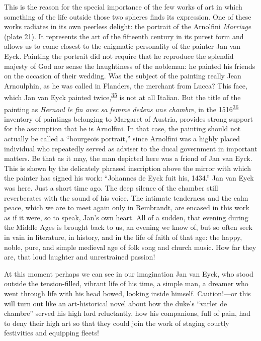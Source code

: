 This is the reason for the special importance of the few works of art in
which something of the life outside those two spheres finds its
expression. One of these works radiates in its own peerless delight: the
portrait of the Arnolfini \emph{Marriage}
(\protect\hyperlink{20_ILLUSTRATIONS_FOLLOW_PAGE.xhtmlux5cux23id_20}{plate
21}). It represents the art of the fifteenth century in its purest form
and allows us to come closest to the enigmatic personality of the
painter Jan van Eyck. Painting the portrait did not require that he
reproduce the splendid majesty of God nor sense the haughtiness of the
nobleman: he painted his friends on the occasion of their wedding. Was
the subject of the painting really Jean Arnoulphin, as he was called in
Flanders, the merchant from Lucca? This face, which Jan van Eyck painted
twice,\textsuperscript{\protect\hypertarget{20_ILLUSTRATIONS_FOLLOW_PAGE.xhtmlux5cux23id_403}{\protect\hyperlink{23_NOTES.xhtmlux5cux23id_404}{35}}}
is not at all Italian. But the title of the painting as \emph{Hernoul le
fin avec sa femme dedens une chambre}, in the
1516\textsuperscript{\protect\hypertarget{20_ILLUSTRATIONS_FOLLOW_PAGE.xhtmlux5cux23id_401}{\protect\hyperlink{23_NOTES.xhtmlux5cux23id_402}{36}}}
inventory of paintings belonging to Margaret of Austria, provides strong
support for the assumption that he is Arnolfini. In that case, the
painting should not actually be called a ``bourgeois portrait,'' since
Arnolfini was a highly placed individual who repeatedly served as
adviser to the ducal government in important matters. Be that as it may,
the man depicted here was a friend of Jan van Eyck. This is shown by the
delicately phrased inscription above the mirror with which the painter
has signed his work: ``Johannes de Eyck fuit his, 1434.'' Jan van Eyck
was here. Just a short time ago. The deep silence of the chamber still
reverberates with the sound of his voice. The intimate tenderness and
the calm peace, which we are to meet again only in Rembrandt, are
encased in this work as if it were, so to speak, Jan's own heart. All of
a sudden, that evening during the Middle Ages is brought back to us, an
evening we know of, but so often seek in vain in literature, in history,
and in the life of faith of that age: the happy, noble, pure,
\protect\hypertarget{20_ILLUSTRATIONS_FOLLOW_PAGE.xhtmlux5cux23page_313}{}{}and
simple medieval age of folk song and church music. How far they are,
that loud laughter and unrestrained passion!

At this moment perhaps we can see in our imagination Jan van Eyck, who
stood outside the tension-filled, vibrant life of his time, a simple
man, a dreamer who went through life with his head bowed, looking inside
himself. Caution!---or this will turn out like an art-historical novel
about how the duke's ``varlet de chambre'' served his high lord
reluctantly, how his companions, full of pain, had to deny their high
art so that they could join the work of staging courtly festivities and
equipping fleets!

